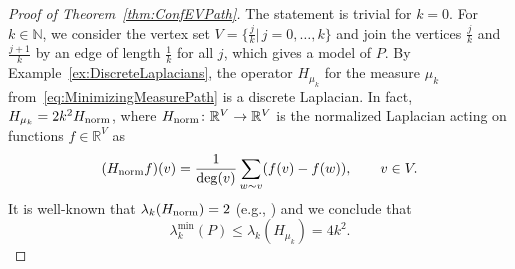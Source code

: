 \documentclass[reqno]{amsart}
\theoremstyle{plain}
\theoremstyle{definition}
\theoremstyle{remark}
\numberwithin{equation}{section}
\newcommand{\N}{\mathbb{N}}     %
\newcommand{\R}{\mathbb{R}}     %
\begin{document}
\begin{proof}[Proof of Theorem~\ref{thm:ConfEVPath}]
	The statement is trivial for $k=0$. For $k \in \N$, we consider the vertex set $V = \{\frac{j}{k} | \, j=0, \dots, k\}$ and join the vertices $\frac{j}{k}$ and $\frac{j+1}{k}$ by an edge of length $\frac{1}{k}$ for all $j$, which gives a model of $P$. By Example~\ref{ex:DiscreteLaplacians}, the operator $H_{\mu_k}$ for the measure $\mu_k$ from~\eqref{eq:MinimizingMeasurePath} is a discrete Laplacian. In fact, $H_{\mu_k} = 2k^2 H_{\rm{norm}}$, where $H_{\rm{norm}} \colon \R^V \to \R^V$ is the normalized Laplacian acting on functions $f \in \R^V$ as
	\[
	(H_{\rm{norm}} f)(v) =\frac{1}{\deg(v)} \sum_{w \sim v} (f(v)-f(w)), \qquad v \in V.
	\]
	It is well-known that $\lambda_k(H_{\rm{norm}})= 2$ (e.g., \cite[Example 1.4]{chung}) and we conclude that
	\[
	\lambda_k^{\min}(P) \le \lambda_k(H_{\mu_k}) = 4k^2.
	\]
	

\end{proof}
\end{document}

